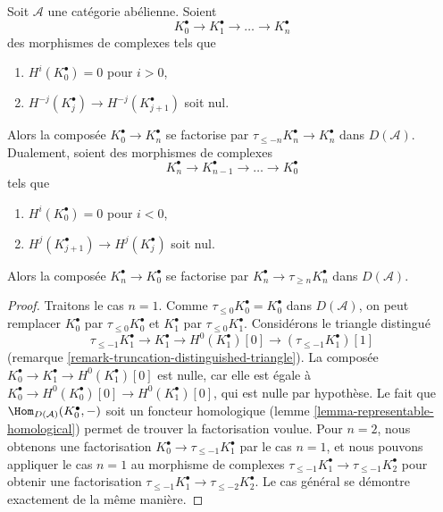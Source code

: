 \begin{lemma}
\label{lemma-trick-vanishing-composition}
Soit $\mathcal{A}$ une catégorie abélienne. Soient
$$
K_0^\bullet \to K_1^\bullet \to \ldots \to K_n^\bullet
$$
des morphismes de complexes tels que
\begin{enumerate}
\item $H^i(K_0^\bullet) = 0$ pour $i > 0$,
\item $H^{-j}(K_j^\bullet) \to H^{-j}(K_{j + 1}^\bullet)$ soit nul.
\end{enumerate}
Alors la composée $K_0^\bullet \to K_n^\bullet$ se factorise par
$\tau_{\leq -n}K_n^\bullet \to K_n^\bullet$ dans $D(\mathcal{A})$.
Dualement, soient des morphismes
de complexes
$$
K_n^\bullet \to K_{n - 1}^\bullet \to \ldots \to K_0^\bullet
$$
tels que
\begin{enumerate}
\item $H^i(K_0^\bullet) = 0$ pour $i < 0$,
\item $H^j(K_{j + 1}^\bullet) \to H^j(K_j^\bullet)$ soit nul.
\end{enumerate}
Alors la composée $K_n^\bullet \to K_0^\bullet$ se factorise par
$K_n^\bullet \to \tau_{\geq n}K_n^\bullet$ dans $D(\mathcal{A})$.
\end{lemma}

\begin{proof}
Traitons le cas $n = 1$. Comme
$\tau_{\leq 0}K_0^\bullet = K_0^\bullet$ dans $D(\mathcal{A})$, on peut
remplacer $K_0^\bullet$ par $\tau_{\leq 0}K_0^\bullet$ et $K_1^\bullet$ par
$\tau_{\leq 0}K_1^\bullet$. Considérons le triangle distingué
$$
\tau_{\leq -1}K_1^\bullet \to K_1^\bullet \to
H^0(K_1^\bullet)[0] \to (\tau_{\leq -1}K_1^\bullet)[1]
$$
(remarque \ref{remark-truncation-distinguished-triangle}). La composée
$K_0^\bullet \to K_1^\bullet \to H^0(K_1^\bullet)[0]$ est nulle, car elle est
égale à
$K_0^\bullet \to H^0(K_0^\bullet)[0] \to H^0(K_1^\bullet)[0]$, qui est nulle
par hypothèse. Le fait que
$\Hom_{D(\mathcal{A})}(K_0^\bullet, -)$ soit un foncteur homologique
(lemme \ref{lemma-representable-homological}) permet de trouver la
factorisation voulue. Pour $n = 2$, nous obtenons une factorisation
$K_0^\bullet \to \tau_{\leq -1}K_1^\bullet$ par le cas $n = 1$, et nous
pouvons appliquer le cas $n = 1$ au morphisme de complexes
$\tau_{\leq -1}K_1^\bullet \to \tau_{\leq -1}K_2^\bullet$ pour obtenir une
factorisation
$\tau_{\leq -1}K_1^\bullet \to \tau_{\leq -2}K_2^\bullet$.
Le cas général se démontre exactement de la même manière.
\end{proof}




